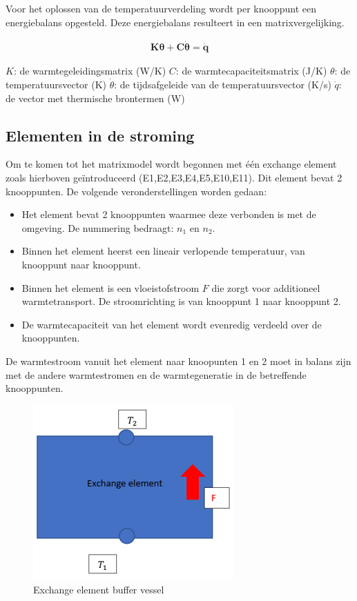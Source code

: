 Voor het oplossen van de temperatuurverdeling wordt per knooppunt een energiebalans opgesteld.
Deze energiebalans resulteert in een matrixvergelijking.

\begin{equation}
	\begin{aligned}
	    \mathbf{K \theta + C \dot{\theta}} = \mathbf{\dot{q}}	    	
	\end{aligned}
\end{equation}

$K$: de warmtegeleidingsmatrix (W/K)
$C$: de warmtecapaciteitsmatrix (J/K)
$\theta$: de temperatuursvector (K)
$\dot{\theta}$: de tijdsafgeleide van de temperatuursvector (K/s)
$\dot{q}$: de vector met thermische brontermen (W)

\subsection{Elementen in de stroming}

Om te komen tot het matrixmodel wordt begonnen met één exchange element zoals hierboven
geïntroduceerd (E1,E2,E3,E4,E5,E10,E11). Dit element bevat 2 knooppunten. De volgende veronderstellingen worden gedaan:

\begin{itemize}
	\item Het element bevat 2 knooppunten waarmee deze verbonden is met de omgeving. De
	nummering bedraagt: $n_1$ en $n_2$.
	\item Binnen het element heerst een lineair verlopende temperatuur, van knooppunt naar
	knooppunt.
	\item Binnen het element is een vloeistofstroom $F$ die zorgt voor additioneel warmtetransport. De stroomrichting is van knooppunt 1 naar knooppunt 2.
	\item De warmtecapaciteit van het element wordt evenredig verdeeld over de knooppunten.
\end{itemize}

De warmtestroom vanuit het element naar knoopunten 1 en 2 moet in balans zijn met de andere
warmtestromen en de warmtegeneratie in de betreffende knooppunten.

\begin{figure}[H]
	\centering
	\includegraphics[width=0.7\columnwidth]{Pictures/exchange_element.png}
	\caption[Short title]{Exchange element buffer vessel}
	\label{fig:exchange_element}
\end{figure}

